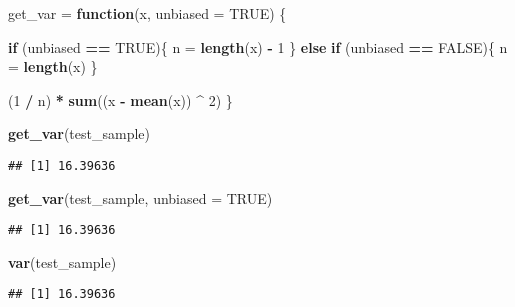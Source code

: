 \documentclass[]{book}
\newenvironment{Shaded}{\begin{snugshade}}{\end{snugshade}}
\newcommand{\KeywordTok}[1]{\textcolor[rgb]{0.13,0.29,0.53}{\textbf{#1}}}
\newcommand{\DataTypeTok}[1]{\textcolor[rgb]{0.13,0.29,0.53}{#1}}
\newcommand{\DecValTok}[1]{\textcolor[rgb]{0.00,0.00,0.81}{#1}}
\newcommand{\StringTok}[1]{\textcolor[rgb]{0.31,0.60,0.02}{#1}}
\newcommand{\OtherTok}[1]{\textcolor[rgb]{0.56,0.35,0.01}{#1}}
\newcommand{\ControlFlowTok}[1]{\textcolor[rgb]{0.13,0.29,0.53}{\textbf{#1}}}
\newcommand{\OperatorTok}[1]{\textcolor[rgb]{0.81,0.36,0.00}{\textbf{#1}}}
\newcommand{\NormalTok}[1]{#1}
\begin{document}
\begin{Shaded}
\begin{Highlighting}[]
\NormalTok{get_var =}\StringTok{ }\ControlFlowTok{function}\NormalTok{(x, }\DataTypeTok{unbiased =} \OtherTok{TRUE}\NormalTok{) \{}

  \ControlFlowTok{if}\NormalTok{ (unbiased }\OperatorTok{==}\StringTok{ }\OtherTok{TRUE}\NormalTok{)\{}
\NormalTok{    n =}\StringTok{ }\KeywordTok{length}\NormalTok{(x) }\OperatorTok{-}\StringTok{ }\DecValTok{1}
\NormalTok{  \} }\ControlFlowTok{else} \ControlFlowTok{if}\NormalTok{ (unbiased }\OperatorTok{==}\StringTok{ }\OtherTok{FALSE}\NormalTok{)\{}
\NormalTok{    n =}\StringTok{ }\KeywordTok{length}\NormalTok{(x) }
\NormalTok{   \}}

\NormalTok{  (}\DecValTok{1} \OperatorTok{/}\StringTok{ }\NormalTok{n) }\OperatorTok{*}\StringTok{ }\KeywordTok{sum}\NormalTok{((x }\OperatorTok{-}\StringTok{ }\KeywordTok{mean}\NormalTok{(x)) }\OperatorTok{^}\StringTok{ }\DecValTok{2}\NormalTok{)}
\NormalTok{\}}
\end{Highlighting}
\end{Shaded}

\begin{Shaded}
\begin{Highlighting}[]
\KeywordTok{get_var}\NormalTok{(test_sample)}
\end{Highlighting}
\end{Shaded}

\begin{verbatim}
## [1] 16.39636
\end{verbatim}

\begin{Shaded}
\begin{Highlighting}[]
\KeywordTok{get_var}\NormalTok{(test_sample, }\DataTypeTok{unbiased =} \OtherTok{TRUE}\NormalTok{)}
\end{Highlighting}
\end{Shaded}

\begin{verbatim}
## [1] 16.39636
\end{verbatim}

\begin{Shaded}
\begin{Highlighting}[]
\KeywordTok{var}\NormalTok{(test_sample)}
\end{Highlighting}
\end{Shaded}

\begin{verbatim}
## [1] 16.39636
\end{verbatim}
\end{document}
